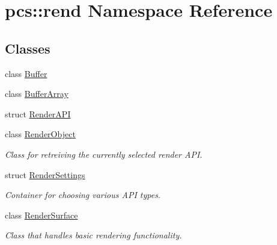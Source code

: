 \hypertarget{namespacepcs_1_1rend}{}\section{pcs\+:\+:rend Namespace Reference}
\label{namespacepcs_1_1rend}
\subsection*{Classes}
\begin{DoxyCompactItemize}
\item 
class \hyperlink{classpcs_1_1rend_1_1Buffer}{Buffer}
\item 
class \hyperlink{classpcs_1_1rend_1_1BufferArray}{Buffer\+Array}
\item 
struct \hyperlink{structpcs_1_1rend_1_1RenderAPI}{Render\+A\+PI}
\item 
class \hyperlink{classpcs_1_1rend_1_1RenderObject}{Render\+Object}
\begin{DoxyCompactList}\small\item\em Class for retreiving the currently selected render A\+PI. \end{DoxyCompactList}\item 
struct \hyperlink{structpcs_1_1rend_1_1RenderSettings}{Render\+Settings}
\begin{DoxyCompactList}\small\item\em Container for choosing various A\+PI types. \end{DoxyCompactList}\item 
class \hyperlink{classpcs_1_1rend_1_1RenderSurface}{Render\+Surface}
\begin{DoxyCompactList}\small\item\em Class that handles basic rendering functionality. \end{DoxyCompactList}\end{DoxyCompactItemize}
